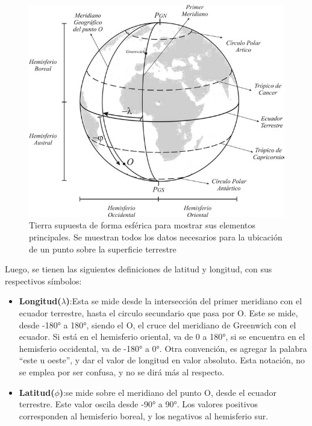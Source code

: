 \begin{figure}[ht!]
	\includegraphics{coordenadas_terrestres}
	\caption{Tierra supuesta de forma esférica para mostrar sus elementos principales. Se muestran todos los datos necesarios para la ubicación de un punto sobre la superficie terrestre}
	\label{fig:coord_terr}
\end{figure}

Luego, se tienen las siguientes definiciones de latitud y longitud, con sus respectivos símbolos: 

\begin{itemize}
	\item \textbf{Longitud($\lambda$)}:Esta se mide desde la intersección del primer meridiano con el ecuador terrestre, hasta el circulo secundario que pasa por O. Este se mide, desde -180° a 180°, siendo el O, el cruce del meridiano de Greenwich con el ecuador. Si está en el hemisferio oriental, va de 0 a 180°, si se encuentra en el hemisferio occidental, va de -180° a 0°. Otra convención, es agregar la palabra “este u oeste”, y dar el valor de longitud en valor absoluto. Esta notación, no se emplea por ser confusa, y no se dirá más al respecto. 
	\item \textbf{Latitud($\phi$)}:se mide sobre el meridiano del punto O, desde el ecuador terrestre. Este valor oscila desde -90° a 90°. Los valores positivos corresponden al hemisferio boreal, y los negativos al hemisferio sur.
\end{itemize}


